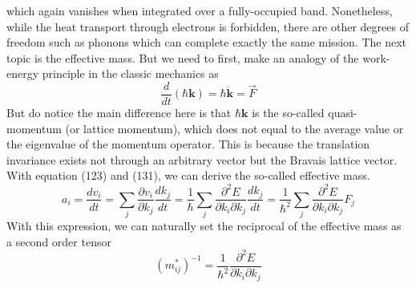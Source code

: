 \documentclass{article}
\begin{document}
which again vanishes when integrated over a fully-occupied band. Nonetheless, while the heat transport through electrons is forbidden, there are other degrees of freedom such as phonons which can complete exactly the same mission. The next topic is the effective mass. But we need to first, make an analogy of the work-energy principle in the classic mechanics as\begin{equation}
    \frac{d}{dt}(\hbar\mathbf{k})=\hbar\dot{\mathbf{k}}=\vec{F}
\end{equation}
But do notice the main difference here is that $\hbar\mathbf{k}$ is the so-called quasi-momentum (or lattice momentum), which does not equal to the average value or the eigenvalue of the momentum operator. This is because the translation invariance exists not through an arbitrary vector but the Bravais lattice vector. With equation (123) and (131), we can derive the so-called effective mass.\begin{equation}
    a_i=\frac{dv_i}{dt}=\sum_j\frac{\partial{v_i}}{\partial{k_j}}\frac{dk_j}{dt}=\frac1{\hbar}\sum_j\frac{\partial^2E}{\partial{k_i}\partial{k_j}}\frac{dk_j}{dt}=\frac1{\hbar^2}\sum_j\frac{\partial^2E}{\partial{k_i}\partial{k_j}}F_j
\end{equation}
With this expression, we can naturally set the reciprocal of the effective mass as a second order tensor\begin{equation}
    (m^*_{ij})^{-1}=\frac1{\hbar^2}\frac{\partial^2E}{\partial{k_i}\partial{k_j}}
\end{equation}
\end{document}
